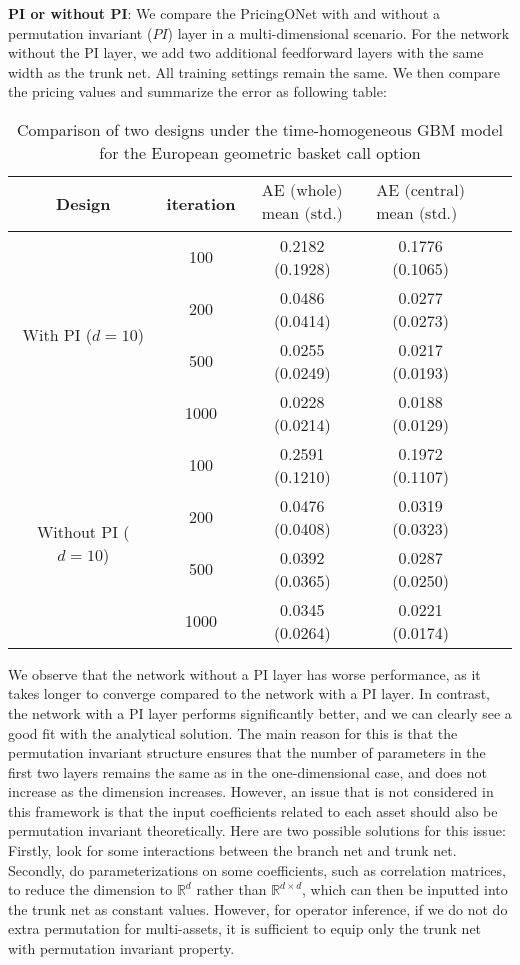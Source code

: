 \documentclass[11pt,a4paper]{article}
\theoremstyle{remark}
\begin{document}
	\noindent \textbf{PI or without PI}: We compare the PricingONet with and without a permutation invariant ($PI$) layer in a multi-dimensional scenario. For the network without the PI layer, we add two additional feedforward layers with the same width as the trunk net. All training settings remain the same. We then compare the pricing values and summarize the error as following table:
	\begin{table}[htbp!]
		\centering
		\begin{tabular}{cccccc}
			\hline Design & iteration & $\begin{array}{c}\text{AE (whole)} \\
				\text{mean (std.)} \end{array}$   & $\begin{array}{c}\text{AE (central)} \\
				\text{mean (std.)} \end{array}$  \\
			\hline \multirow{4}{*}{With PI ($d=10$)} & 100 & 0.2182 (0.1928) & 0.1776 (0.1065) \\
			& 200 & 0.0486 (0.0414) & 0.0277 (0.0273) \\
			& 500 & 0.0255 (0.0249) & 0.0217 (0.0193) \\
			& 1000 & 0.0228 (0.0214) & 0.0188 (0.0129) \\ 
			\hline \multirow{4}{*}{Without PI ($d=10$)} & 100 & 0.2591 (0.1210) & 0.1972 (0.1107) \\
			& 200 & 0.0476 (0.0408) & 0.0319 (0.0323) \\
			& 500 & 0.0392 (0.0365) & 0.0287 (0.0250) \\
			& 1000 & 0.0345 (0.0264) & 0.0221 (0.0174) \\
			\hline
		\end{tabular}
		\caption{Comparison of two designs under the time-homogeneous GBM model for the European geometric basket call option}
		\label{tab:comp-PI}
	\end{table}
	
	We observe that the network without a PI layer has worse performance, as it takes longer to converge compared to the network with a PI layer. In contrast, the network with a PI layer performs significantly better, and we can clearly see a good fit with the analytical solution. The main reason for this is that the permutation invariant structure ensures that the number of parameters in the first two layers remains the same as in the one-dimensional case, and does not increase as the dimension increases. However, an issue that is not considered in this framework is that the input coefficients related to each asset should also be permutation invariant theoretically. Here are two possible solutions for this issue: Firstly, look for some interactions between the branch net and trunk net. Secondly, do parameterizations on some coefficients, such as correlation matrices, to reduce the dimension to $\mathbb{R}^d$ rather than $\mathbb{R}^{d \times d}$, which can then be inputted into the trunk net as constant values. However, for operator inference, if we do not do extra permutation for multi-assets, it is sufficient to equip only the trunk net with permutation invariant property.
	
\end{document}
